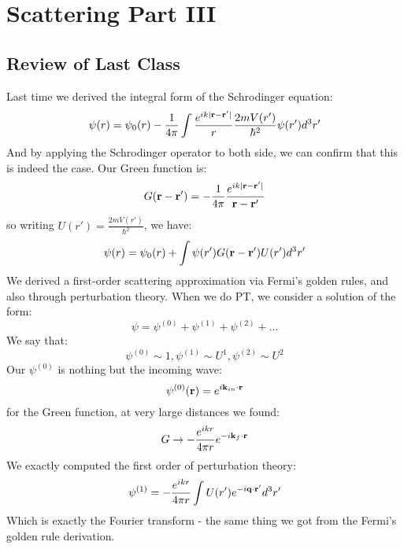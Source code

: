 \section{Scattering Part III}
\subsection{Review of Last Class}
Last time we derived the integral form of the Schrodinger equation:
\begin{equation}\label{eq-Seintegral}
    \psi(r) = \psi_0(r) - \frac{1}{4\pi}\int \frac{e^{ik\lvert \mathbf{r} - \mathbf{r}' \rvert}}{r}\frac{2mV(r')}{\hbar^2}\psi(r')d^3r'
\end{equation}
And by applying the Schrodinger operator to both side, we can confirm that this is indeed the case. Our Green function is:
\begin{equation}
    G(\mathbf{r} - \mathbf{r}') = -\frac{1}{4\pi}\frac{e^{ik\lvert \mathbf{r} - \mathbf{r}' \rvert}}{\mathbf{r} - \mathbf{r}'}
\end{equation}
so writing $U(r') = \frac{2mV(r')}{\hbar^2}$, we have:
\begin{equation}
    \psi(r) = \psi_0(r) + \int \psi(r')G(\mathbf{r} - \mathbf{r}')U(r')d^3r'
\end{equation}
We derived a first-order scattering approximation via Fermi's golden rules, and also through perturbation theory. When we do PT, we consider a solution of the form:
\begin{equation}
    \psi = \psi^{(0)} + \psi^{(1)} + \psi^{(2)} + \ldots
\end{equation}
We say that:
\begin{equation}
    \psi^{(0)} \sim 1, \psi^{(1)} \sim U^1, \psi^{(2)} \sim U^2
\end{equation}
Our $\psi^{(0)}$ is nothing but the incoming wave:
\begin{equation}
    \psi^{(0)}(\mathbf{r}) = e^{i\mathbf{k}_{in}\cdot \mathbf{r}}
\end{equation}
for the Green function, at very large distances we found:
\begin{equation}
    G \to -\frac{e^{ikr}}{4\pi r} e^{-i\mathbf{k}_f \cdot \mathbf{r}}
\end{equation}
We exactly computed the first order of perturbation theory:
\begin{equation}
    \psi^{(1)} = - \frac{e^{ikr}}{4\pi r} \int U(r')e^{-i\mathbf{q} \cdot \mathbf{r}'}d^3r'
\end{equation}
Which is exactly the Fourier transform - the same thing we got from the Fermi's golden rule derivation.

